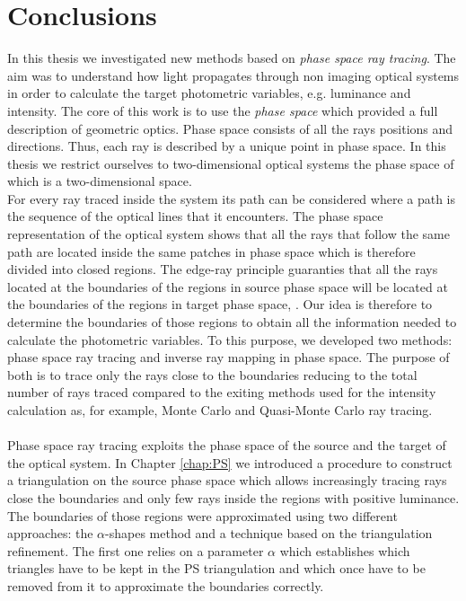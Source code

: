 \chapter{Conclusions}\label{chap:conclusions}
In this thesis we investigated new methods based on \textit{phase space ray tracing}. The aim was to understand how light propagates through non imaging optical systems in order to calculate the target photometric variables, e.g. luminance and intensity. 
The core of this work is to use the \textit{phase space} which provided a full description of geometric optics. Phase space consists of all the rays positions and directions. Thus, each ray is described by a unique point in phase space. In this thesis we restrict ourselves to two-dimensional optical systems the phase space of which is a two-dimensional space. 
\\ \indent For every ray traced inside the system its path can be considered where a path is the sequence of the optical lines that it encounters. The phase space representation of the optical system shows that all the rays that follow the same path are located inside the same patches in phase space which is therefore divided into closed regions. The edge-ray principle guaranties that all the rays located at the boundaries of the regions in source phase space will be located at the boundaries of the regions in target phase space, \cite{Ries:2}. Our idea is therefore to determine the boundaries of those regions to obtain all the information needed to calculate the photometric variables. 
To this purpose, we developed two methods: phase space ray tracing and inverse ray mapping in phase space. The purpose of both is to trace only the rays close to the boundaries reducing to the total number of rays traced compared to the exiting methods used for the intensity calculation as, for example, Monte Carlo and Quasi-Monte Carlo ray tracing.
\\ \\ \indent Phase space ray tracing exploits the phase space of the source and the target of the optical system. In Chapter \ref{chap:PS} we introduced a procedure to construct a triangulation on the source phase space which allows increasingly tracing rays close the boundaries and only few rays inside the regions with positive luminance. 
The boundaries of those regions were approximated using two different approaches: the $\alpha$-shapes method and a technique based on the triangulation refinement. The first one relies on a parameter $\alpha$ which establishes which triangles have to be kept in the PS triangulation and which once have to be removed from it to approximate the boundaries correctly. 
